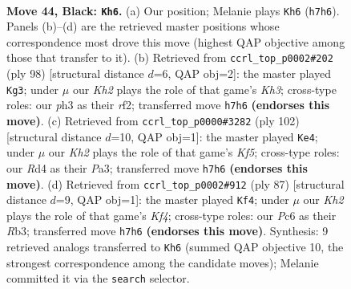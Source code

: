 \documentclass[11pt]{article}
\begin{document}
\clearpage

\begin{figure}[p]\centering
\begin{subfigure}{0.46\textwidth}\centering
\resizebox{\linewidth}{!}{%
\newchessgame
\chessboard[
  setfen={8/p2p3k/2p2K2/8/3r4/7P/5P2/8 b - - 0 44},
  showmover=false,
  pgfstyle=straightmove, color=movearrow, markmove={h7-h6}
]}
\caption{}
\end{subfigure}\hfill
\begin{subfigure}{0.46\textwidth}\centering
\resizebox{\linewidth}{!}{%
\newchessgame
\chessboard[
  setfen={8/8/1p6/6k1/1P2R3/P6K/5r2/8 w - - 0 50},
  showmover=false,
  pgfstyle=straightmove, color=movearrow, markmove={h3-g3}
]}
\caption{}
\end{subfigure}
\\[4pt]
\begin{subfigure}{0.46\textwidth}\centering
\resizebox{\linewidth}{!}{%
\newchessgame
\chessboard[
  setfen={8/7p/3k4/5KP1/p1p4P/P7/8/8 w - - 0 52},
  showmover=false,
  pgfstyle=straightmove, color=movearrow, markmove={f5-e4}
]}
\caption{}
\end{subfigure}\hfill
\begin{subfigure}{0.46\textwidth}\centering
\resizebox{\linewidth}{!}{%
\newchessgame
\chessboard[
  setfen={8/8/8/5k1p/P1P5/1r5p/5K2/2R5 b - - 1 44},
  showmover=false,
  pgfstyle=straightmove, color=movearrow, markmove={f5-f4}
]}
\caption{}
\end{subfigure}
\caption{\textbf{Move 44, Black: \texttt{Kh6}.} (a) Our position; Melanie plays \texttt{Kh6} (\texttt{h7h6}). Panels (b)--(d) are the retrieved master positions whose correspondence most drove this move (highest QAP objective among those that transfer to it). (b) Retrieved from \texttt{ccrl\_top\_p0002\#202} (ply 98) [structural distance $d$=6, QAP obj=2]: the master played \texttt{Kg3}; under $\mu$ our \emph{Kh2} plays the role of that game's \emph{Kh3}; cross-type roles: our \emph{p}h3 as their \emph{r}f2; transferred move \texttt{h7h6} \textbf{(endorses this move)}. (c) Retrieved from \texttt{ccrl\_top\_p0000\#3282} (ply 102) [structural distance $d$=10, QAP obj=1]: the master played \texttt{Ke4}; under $\mu$ our \emph{Kh2} plays the role of that game's \emph{Kf5}; cross-type roles: our \emph{R}d4 as their \emph{P}a3; transferred move \texttt{h7h6} \textbf{(endorses this move)}. (d) Retrieved from \texttt{ccrl\_top\_p0002\#912} (ply 87) [structural distance $d$=9, QAP obj=1]: the master played \texttt{Kf4}; under $\mu$ our \emph{Kh2} plays the role of that game's \emph{Kf4}; cross-type roles: our \emph{P}c6 as their \emph{R}b3; transferred move \texttt{h7h6} \textbf{(endorses this move)}. Synthesis: 9 retrieved analogs transferred to \texttt{Kh6} (summed QAP objective 10, the strongest correspondence among the candidate moves); Melanie committed it via the \texttt{search} selector.}
\label{fig:thought-m87}
\end{figure}
\end{document}
